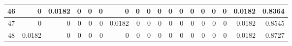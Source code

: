 \begin{table}[ht]
\begin{adjustbox}{width = \textwidth, center}
\begin{tabular}{|c|r|r|r|r|r|r|r|r|r|r|r|r|r|r|r|r|r|}
            \rowcolor[HTML]{FFFFFF} 
            \cellcolor[HTML]{CFE2F3}46                           & 0                                              & \cellcolor[HTML]{C7E9D8}0.0182                 & 0                                              & 0                                              & 0                                              & 0                                              & 0                                              & 0                                               & 0                                               & 0                                               & 0                                               & 0                                               & 0                                               & 0                                               & 0                                               & \cellcolor[HTML]{D9D2E9}0.0182                                                        & \cellcolor[HTML]{D9D2E9}0.8364                                                            \\ \hline
            \rowcolor[HTML]{FFFFFF} 
            \cellcolor[HTML]{CFE2F3}47                           & 0                                              & 0                                              & 0                                              & 0                                              & 0                                              & \cellcolor[HTML]{C7E9D8}0.0182                 & 0                                              & 0                                               & 0                                               & 0                                               & 0                                               & 0                                               & 0                                               & 0                                               & 0                                               & \cellcolor[HTML]{D9D2E9}0.0182                                                        & \cellcolor[HTML]{D9D2E9}0.8545                                                            \\ \hline
            \rowcolor[HTML]{FFFFFF} 
            \cellcolor[HTML]{CFE2F3}48                           & \cellcolor[HTML]{C7E9D8}0.0182                 & 0                                              & 0                                              & 0                                              & 0                                              & 0                                              & 0                                              & 0                                               & 0                                               & 0                                               & 0                                               & 0                                               & 0                                               & 0                                               & 0                                               & \cellcolor[HTML]{D9D2E9}0.0182                                                        & \cellcolor[HTML]{D9D2E9}0.8727                                                            \\ \hline

\end{tabular}
\end{adjustbox}
\end{table}
